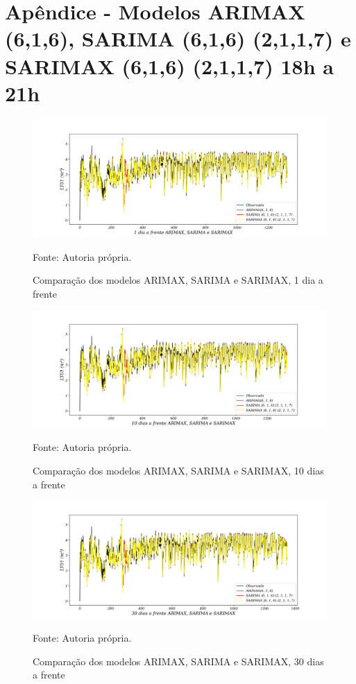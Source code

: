 
\section{Apêndice - Modelos ARIMAX (6,1,6), SARIMA (6,1,6) (2,1,1,7) e SARIMAX (6,1,6) (2,1,1,7) 18h a 21h}\label{sec:arimaxsarimasarimax18}

\begin{figure}[H]
	\centering
	\caption{Comparação dos modelos ARIMAX, SARIMA e SARIMAX, 1 dia a frente }
	\label{fig:1-ARIMAX-SARIMA-SARIMAX}
	\includegraphics[width=1\linewidth]{Apendices/Figuras/modelagem-18-a-21h/1-ARIMAX-SARIMA-SARIMAX}
	
	Fonte: Autoria própria.
\end{figure}

\begin{figure}[H]
	\centering
	\caption{Comparação dos modelos ARIMAX, SARIMA e SARIMAX, 10 dias a frente }
	\label{fig:10-ARIMAX-SARIMA-SARIMAX}
	\includegraphics[width=1\linewidth]{Apendices/Figuras/modelagem-18-a-21h/10-ARIMAX-SARIMA-SARIMAX}
	
	Fonte: Autoria própria.
\end{figure}


\begin{figure}[H]
	\centering
	\caption{Comparação dos modelos ARIMAX, SARIMA e SARIMAX, 30 dias a frente }
	\label{fig:30-ARIMAX-SARIMA-SARIMAX}
	\includegraphics[width=1\linewidth]{Apendices/Figuras/modelagem-18-a-21h/30-ARIMAX-SARIMA-SARIMAX}
	
	Fonte: Autoria própria.
\end{figure}

